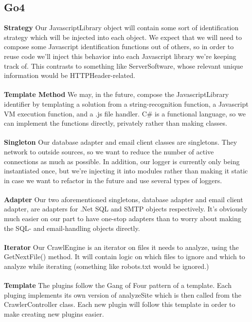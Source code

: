 \documentclass{article}
\begin{document}
\subsection{Go4}
\textbf{Strategy} Our JavascriptLibrary object will contain some sort of identification strategy which will be injected into each object. We expect that we will need to compose some Javascript identification functions out of others, so in order to reuse code we’ll inject this behavior into each Javascript library we’re keeping track of.  This contrasts to something like ServerSoftware, whose relevant unique information would be HTTPHeader-related.\\\\
\textbf{Template Method} We may, in the future, compose the JavascriptLibrary identifier by templating a solution from a string-recognition function, a Javascript VM execution function, and a .js file handler. C\# is a functional language, so we can implement the functions directly, privately rather than making classes.\\\\
\textbf{Singleton} Our database adapter and email client classes are singletons. They network to outside sources, so we want to reduce the number of active connections as much as possible. In addition, our logger is currently only being instantiated once, but we’re injecting it into modules rather than making it static in case we want to refactor in the future and use several types of loggers.\\\\
\textbf{Adapter} Our two aforementioned singletons, database adapter and email client adapter, are adapters for .Net SQL and SMTP objects respectively. It’s obviously much easier on our part to have one-stop adapters than to worry about making the SQL- and email-handling objects directly.\\\\
\textbf{Iterator} Our CrawlEngine is an iterator on files it needs to analyze, using the GetNextFile() method. It will contain logic on which files to ignore and which to analyze while iterating (something like robots.txt would be ignored.)\\\\
\textbf{Template} The plugins follow the Gang of Four pattern of a template.  Each pluging implements its own version of analyzeSite which is then called from the CrawlerController class.  Each new plugin will follow this template in order to make creating new plugins easier.
\end{document}
